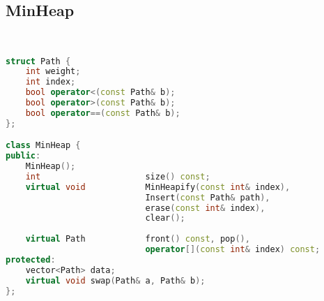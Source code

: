 \subsection{MinHeap}
\begin{lstlisting}[language=C++]


struct Path {
    int weight;
    int index;
    bool operator<(const Path& b);
    bool operator>(const Path& b);
    bool operator==(const Path& b);
};

class MinHeap {
public:
    MinHeap();
    int                     size() const;
    virtual void            MinHeapify(const int& index),
                            Insert(const Path& path),
                            erase(const int& index),
                            clear();
    
    virtual Path            front() const, pop(),
                            operator[](const int& index) const;
protected:
    vector<Path> data;
    virtual void swap(Path& a, Path& b);
};






\end{lstlisting}

